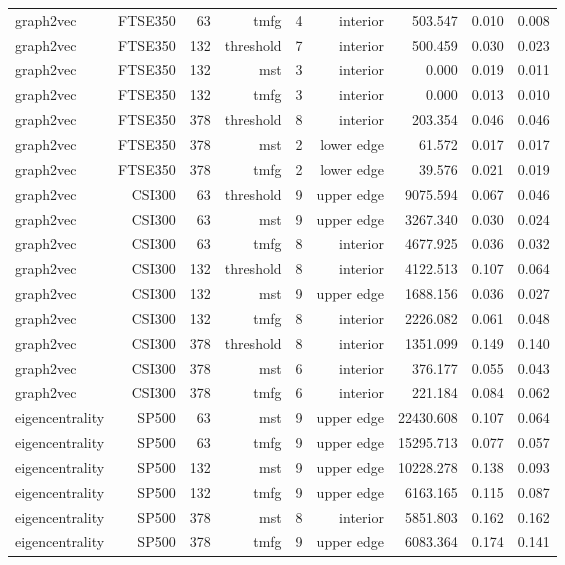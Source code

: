 \begin{tabular}{lrrrrrrrr}
graph2vec & FTSE350 & 63 & tmfg & 4 & interior & 503.547 & 0.010 & 0.008 \\
graph2vec & FTSE350 & 132 & threshold & 7 & interior & 500.459 & 0.030 & 0.023 \\
graph2vec & FTSE350 & 132 & mst & 3 & interior & 0.000 & 0.019 & 0.011 \\
graph2vec & FTSE350 & 132 & tmfg & 3 & interior & 0.000 & 0.013 & 0.010 \\
graph2vec & FTSE350 & 378 & threshold & 8 & interior & 203.354 & 0.046 & 0.046 \\
graph2vec & FTSE350 & 378 & mst & 2 & lower edge & 61.572 & 0.017 & 0.017 \\
graph2vec & FTSE350 & 378 & tmfg & 2 & lower edge & 39.576 & 0.021 & 0.019 \\
graph2vec & CSI300 & 63 & threshold & 9 & upper edge & 9075.594 & 0.067 & 0.046 \\
graph2vec & CSI300 & 63 & mst & 9 & upper edge & 3267.340 & 0.030 & 0.024 \\
graph2vec & CSI300 & 63 & tmfg & 8 & interior & 4677.925 & 0.036 & 0.032 \\
graph2vec & CSI300 & 132 & threshold & 8 & interior & 4122.513 & 0.107 & 0.064 \\
graph2vec & CSI300 & 132 & mst & 9 & upper edge & 1688.156 & 0.036 & 0.027 \\
graph2vec & CSI300 & 132 & tmfg & 8 & interior & 2226.082 & 0.061 & 0.048 \\
graph2vec & CSI300 & 378 & threshold & 8 & interior & 1351.099 & 0.149 & 0.140 \\
graph2vec & CSI300 & 378 & mst & 6 & interior & 376.177 & 0.055 & 0.043 \\
graph2vec & CSI300 & 378 & tmfg & 6 & interior & 221.184 & 0.084 & 0.062 \\
eigencentrality & SP500 & 63 & mst & 9 & upper edge & 22430.608 & 0.107 & 0.064 \\
eigencentrality & SP500 & 63 & tmfg & 9 & upper edge & 15295.713 & 0.077 & 0.057 \\
eigencentrality & SP500 & 132 & mst & 9 & upper edge & 10228.278 & 0.138 & 0.093 \\
eigencentrality & SP500 & 132 & tmfg & 9 & upper edge & 6163.165 & 0.115 & 0.087 \\
eigencentrality & SP500 & 378 & mst & 8 & interior & 5851.803 & 0.162 & 0.162 \\
eigencentrality & SP500 & 378 & tmfg & 9 & upper edge & 6083.364 & 0.174 & 0.141 \\

\end{tabular}
